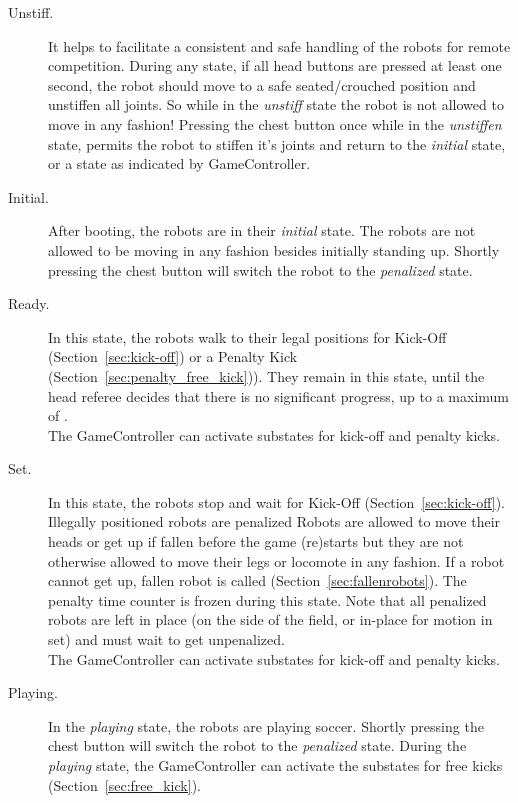 \begin{description}
    \item[Unstiff.]  It helps to facilitate a consistent and safe handling of the robots for remote competition. During any state, if all head buttons are pressed at least one second, the robot should move to a safe seated/crouched position and unstiffen all joints. So while in the \textit{unstiff} state the robot is not allowed to move in any fashion! Pressing the chest button once while in the \textit{unstiffen} state, permits the robot to stiffen it's joints and return to the \textit{initial} state, or a state as indicated by GameController.

	\item[Initial.] After booting, the robots are in their \emph{initial} state. The robots are not allowed to be moving in any fashion besides initially standing up. Shortly pressing the chest button will switch the robot to the \emph{penalized} state.
	
	\item[Ready.] In this state, the robots walk to their legal positions for Kick-Off (\cf Section~\ref{sec:kick-off}) or a Penalty Kick (\cf Section~\ref{sec:penalty_free_kick})). They remain in this state, until the head referee decides that there is no significant progress, up to a maximum of \KickOffAutoTime.\\
    The GameController can activate substates for kick-off and penalty kicks.
	
	\item[Set.] In this state, the robots stop and wait for Kick-Off (\cf Section~\ref{sec:kick-off}).
	Illegally positioned robots are penalized  Robots are allowed to move their heads or get up if fallen before the game (re)starts but they are not otherwise allowed to move their legs or locomote in any fashion. If a robot cannot get up, fallen robot is called (\cf Section~\ref{sec:fallenrobots}). The penalty time counter is frozen during this state.
	Note that all penalized robots are left in place (on the side of the field, or in-place for motion in set) and must wait to get unpenalized.\\
    The GameController can activate substates for kick-off and penalty kicks.
	
	\item[Playing.] In the \emph{playing} state, the robots are playing soccer. Shortly pressing the chest button will switch the robot to the \emph{penalized} state. During the \emph{playing} state, the GameController can activate the substates for free kicks (\cf Section~\ref{sec:free_kick}).
	

\end{description}
